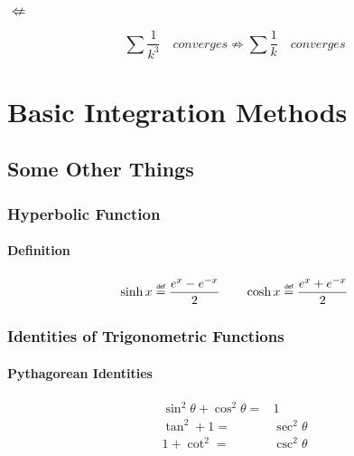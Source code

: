 \documentclass[11pt]{article}
\newcommand\df{\mathrel{\overset{\makebox[0pt]{\mbox{\normalfont\tiny\sffamily def}}}{=}}}
\begin{document}
\subsubsection{$\not \Leftarrow$}
$$
\sum \frac{1}{k^3}\quad \textit{converges} \not \Rightarrow \sum \frac{1}{k}\quad \textit{converges} 
$$


\newpage
\section{Basic Integration Methods}
\subsection{Some Other Things}
\subsubsection{Hyperbolic Function}
\paragraph{Definition}
\begin{equation}
\sinh x \df \frac{e^x-e^{-x}}{2}\qquad
\cosh x \df \frac{e^x+e^{-x}}{2}
\end{equation}
\subsubsection{Identities of Trigonometric Functions}
\paragraph{Pythagorean Identities}
\begin{equation}
\begin{aligned}
\sin^2 \theta + \cos^2 \theta=& 1\\
\tan^2 + 1=&\sec^2 \theta \\
1+ \cot ^2=& \csc^2 \theta 	
\end{aligned}
\end{equation}
\end{document}
